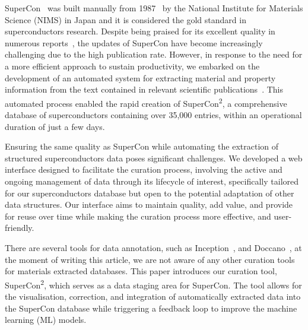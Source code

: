 \documentclass[a4paper]{article}
\begin{document}

SuperCon~\cite{SuperCon} was built manually from 1987~\cite{ishii2023structuring} by the National Institute for Materials Science (NIMS) in Japan and it is considered the gold standard in superconductors research.
Despite being praised for its excellent quality in numerous reports~\cite{roter2020predicting, stanev_machine_2017, tran2022machine, konno2021deep}, the updates of SuperCon have become increasingly challenging due to the high publication rate. However, in response to the need for a more efficient approach to sustain productivity, we embarked on the development of an automated system for extracting material and property information from the text contained in relevant scientific publications~\cite{lfoppiano2023automatic}. This automated process enabled the rapid creation of SuperCon\textsuperscript{2}, a comprehensive database of superconductors containing over 35,000 entries, within an operational duration of just a few days. 

Ensuring the same quality as SuperCon while automating the extraction of structured superconductors data poses significant challenges. 
We developed a web interface designed to facilitate the curation process, involving the active and ongoing management of data through its lifecycle of interest, specifically tailored for our superconductors database but open to the potential adaptation of other data structures. 
Our interface aims to maintain quality, add value, and provide for reuse over time while making the curation process more effective, and user-friendly.

There are several tools for data annotation, such as Inception~\cite{klie-etal-2018-inception}, and Doccano~\cite{doccano}, at the moment of writing this article, we are not aware of any other curation tools for materials extracted databases. 
This paper introduces our curation tool, SuperCon\textsuperscript{2}, which serves as a data staging area for SuperCon. 
The tool allows for the visualisation, correction, and integration of automatically extracted data into the SuperCon database while triggering a feedback loop to improve the machine learning (ML) models.
\end{document}
